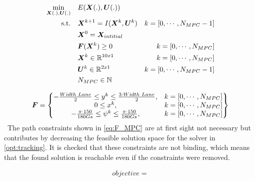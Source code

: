 \begin{equation}\label{opt:tracking}
\begin{aligned}
\min_{\bm{X}(.),\bm{U}(.)} \quad &  E(\bm{X}(.),\bm{U}(.)) \\
\textrm{s.t.} \quad & \bm{X}^{k+1} = I(\bm{X}^{k}, \bm{U}^{k}) & k = [0,\cdots, N_{MPC}-1]\\
& \bm{X}^{0} = \bm{X}_{intitial} \\
& \bm{F}(\bm{X}^{k}) \geq 0	& k = [0,\cdots, N_{MPC}]\\
& \bm{X}^{k}\in \mathbb{R}^{10x1}  & k = [0,\cdots, N_{MPC}]\\
& \bm{U}^{k}\in \mathbb{R}^{2x1} \hspace{3 mm} & k = [0,\cdots, N_{MPC}-1]\\
&  N_{MPC} \in \mathbb{N}
\end{aligned}
\end{equation}

\begin{equation}\label{eq:F_MPC}
\bm{F} =
\begin{Bmatrix}
-\frac{Width\hspace{1mm}Lane}{2} \leq y^k \leq \frac{3\cdot Width\hspace{1mm}Lane}{2}, & k = [0,\cdots, N_{MPC}] \\
0 \leq x^k, & k = [0,\cdots, N_{MPC}] \\
-\frac{\pi\cdot 150}{180 Gs} \leq \psi^k \leq \frac{\pi\cdot 150}{180 Gs}, & k = [0,\cdots, N_{MPC}] 

\end{Bmatrix}
\end{equation}\
The path constraints shown in \ref{eq:F_MPC} are at first sight not necessary but contributes by decreasing the feasible solution space for the solver in \ref{opt:tracking}. It is checked that these constraints are not binding, which means that the found solution is reachable even if the constraints were removed. 

\begin{multline*} \label{eq:obj_mpc}
objective = 








\end{multline*}

 










